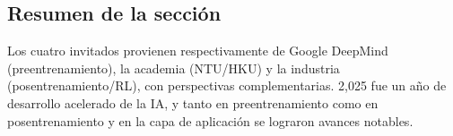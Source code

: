 \subsection{Resumen de la sección}
Los cuatro invitados provienen respectivamente de Google DeepMind (preentrenamiento), la academia (NTU/HKU) y la industria (posentrenamiento/RL), con perspectivas complementarias. 2,025 fue un año de desarrollo acelerado de la IA, y tanto en preentrenamiento como en posentrenamiento y en la capa de aplicación se lograron avances notables.

